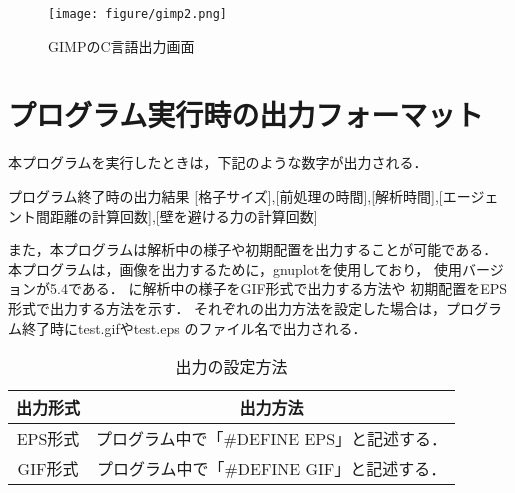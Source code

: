 \begin{figure}[t]
  \begin{center}
    \texttt{[image: figure/gimp2.png]}
    \caption{GIMPのC言語出力画面}
    \label{fig:gimp2}
  \end{center}
\end{figure}

\section{プログラム実行時の出力フォーマット}
本プログラムを実行したときは，下記のような数字が出力される．
%
\begin{itembox}[l]{プログラム終了時の出力結果}
[格子サイズ],[前処理の時間],[解析時間],[エージェント間距離の計算回数],[壁を避ける力の計算回数]
\end{itembox}
%
また，本プログラムは解析中の様子や初期配置を出力することが可能である．
本プログラムは，画像を出力するために，gnuplotを使用しており，
使用バージョンが5.4である．
に解析中の様子をGIF形式で出力する方法や
初期配置をEPS形式で出力する方法を示す．
それぞれの出力方法を設定した場合は，プログラム終了時にtest.gifやtest.eps
のファイル名で出力される．

\begin{table}[t]
  \begin{center}
    \caption{出力の設定方法}
    \label{tb:toggle_outputs}
    \begin{tabular}{c|c}
      \hline \hline
      出力形式 & 出力方法 \\ \hline
      EPS形式  & プログラム中で「\#DEFINE EPS」と記述する．\\ \hline
      GIF形式  & プログラム中で「\#DEFINE GIF」と記述する．\\ \hline
    \end{tabular}
  \end{center}
\end{table}

